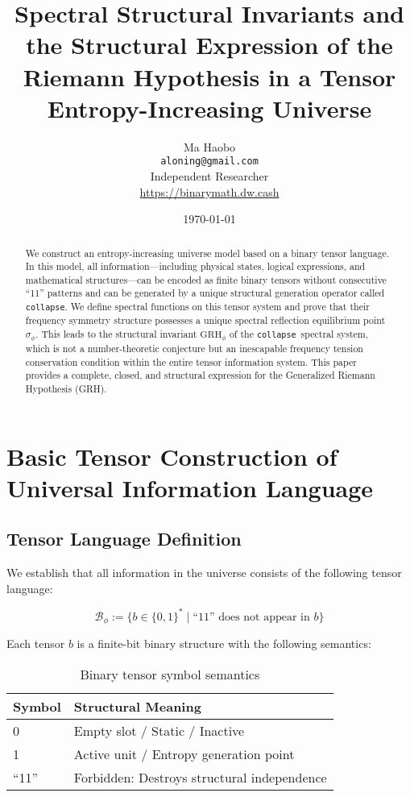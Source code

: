 \documentclass[12pt,a4paper]{article}
\title{Spectral Structural Invariants and the Structural Expression of the Riemann Hypothesis in a Tensor Entropy-Increasing Universe}
\author{
Ma Haobo\\
\texttt{aloning@gmail.com}\\
Independent Researcher\\
\url{https://binarymath.dw.cash}
}
\date{\today}
\theoremstyle{plain}
\theoremstyle{definition}
\theoremstyle{remark}
\newcommand{\collapse}{\texttt{collapse}}
\newcommand{\Bphi}{\mathcal{B}_\phi}
\begin{document}
\maketitle

\begin{abstract}
We construct an entropy-increasing universe model based on a binary tensor language. In this model, all information---including physical states, logical expressions, and mathematical structures---can be encoded as finite binary tensors without consecutive ``11'' patterns and can be generated by a unique structural generation operator called \collapse. We define spectral functions on this tensor system and prove that their frequency symmetry structure possesses a unique spectral reflection equilibrium point $\sigma_\phi$. This leads to the structural invariant $\text{GRH}_\phi$ of the \collapse\ spectral system, which is not a number-theoretic conjecture but an inescapable frequency tension conservation condition within the entire tensor information system. This paper provides a complete, closed, and structural expression for the Generalized Riemann Hypothesis (GRH).
\end{abstract}

\tableofcontents

\section{Basic Tensor Construction of Universal Information Language}

\subsection{Tensor Language Definition}

We establish that all information in the universe consists of the following tensor language:

\begin{equation}
\Bphi := \{ b \in \{0,1\}^* \mid \text{``11'' does not appear in } b \}
\end{equation}

Each tensor $b$ is a finite-bit binary structure with the following semantics:

\begin{table}[h]
\centering
\begin{tabular}{@{}ll@{}}
\toprule
Symbol & Structural Meaning \\
\midrule
0 & Empty slot / Static / Inactive \\
1 & Active unit / Entropy generation point \\
``11'' & Forbidden: Destroys structural independence \\
\bottomrule
\end{tabular}
\caption{Binary tensor symbol semantics}
\end{table}
\end{document}
